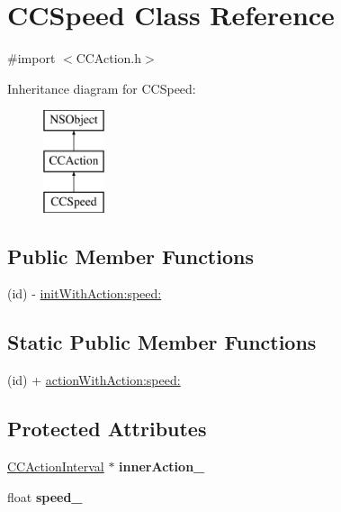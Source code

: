 \hypertarget{interface_c_c_speed}{\section{C\-C\-Speed Class Reference}
\label{interface_c_c_speed}
}


{\ttfamily \#import $<$C\-C\-Action.\-h$>$}

Inheritance diagram for C\-C\-Speed\-:\begin{figure}[H]
\begin{center}
\leavevmode
\includegraphics[height=3.000000cm]{interface_c_c_speed}
\end{center}
\end{figure}
\subsection*{Public Member Functions}
\begin{DoxyCompactItemize}
\item 
(id) -\/ \hyperlink{interface_c_c_speed_a4f017a2b690f6b9f0a04b5f921cedc68}{init\-With\-Action\-:speed\-:}
\end{DoxyCompactItemize}
\subsection*{Static Public Member Functions}
\begin{DoxyCompactItemize}
\item 
(id) + \hyperlink{interface_c_c_speed_a8bb0025307babbcd0110d77959a099ab}{action\-With\-Action\-:speed\-:}
\end{DoxyCompactItemize}
\subsection*{Protected Attributes}
\begin{DoxyCompactItemize}
\item 
\hypertarget{interface_c_c_speed_adf1f77009ed6df2998e10838c9a143ba}{\hyperlink{class_c_c_action_interval}{C\-C\-Action\-Interval} $\ast$ {\bfseries inner\-Action\-\_\-}}\label{interface_c_c_speed_adf1f77009ed6df2998e10838c9a143ba}

\item 
\hypertarget{interface_c_c_speed_a5d5cb99bd209b02e7f318033944cfcfc}{float {\bfseries speed\-\_\-}}\label{interface_c_c_speed_a5d5cb99bd209b02e7f318033944cfcfc}

\end{DoxyCompactItemize}
